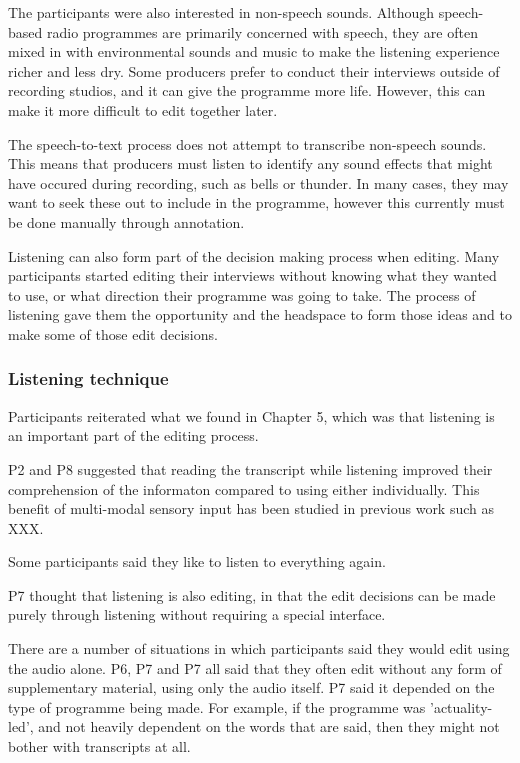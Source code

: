 The participants were also interested in non-speech sounds. Although speech-based radio programmes are primarily
concerned with speech, they are often mixed in with environmental sounds and music to make the listening experience
richer and less dry. Some producers prefer to conduct their interviews outside of recording studios, and it can give
the programme more life. However, this can make it more difficult to edit together later.

The speech-to-text process does not attempt to transcribe non-speech sounds. This means that producers must listen to
identify any sound effects that might have occured during recording, such as bells or thunder. In many cases, they may
want to seek these out to include in the programme, however this currently must be done manually through annotation.

Listening can also form part of the decision making process when editing. Many participants started editing their
interviews without knowing what they wanted to use, or what direction their programme was going to take. The process of
listening gave them the opportunity and the headspace to form those ideas and to make some of those edit decisions.

\subsubsection{Listening technique}

Participants reiterated what we found in Chapter 5, which was that listening is an important part of the editing
process.

P2 and P8 suggested that reading the transcript while listening improved their comprehension of the informaton compared
to using either individually. This benefit of multi-modal sensory input has been studied in previous work such as XXX.

Some participants said they like to listen to everything again.

P7 thought that listening is also editing, in that the edit decisions can be made purely through listening without
requiring a special interface.

There are a number of situations in which participants said they would edit using the audio alone. P6, P7 and P7 all
said that they often edit without any form of supplementary material, using only the audio itself. P7 said it depended
on the type of programme being made. For example, if the programme was 'actuality-led', and not heavily dependent on
the words that are said, then they might not bother with transcripts at all.

